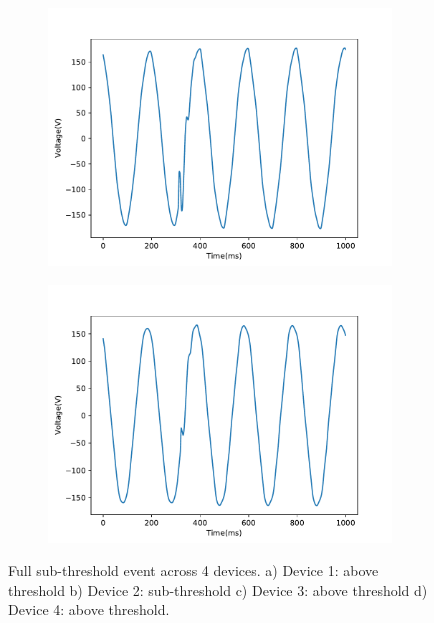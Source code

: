 \begin{figure}[ht!]
    \begin{subfigure}{0.49\textwidth}
        \centering
        \includegraphics[width=1\linewidth]{img/napali_eval/raw_gridwide_sub_full3.pdf}
        \caption{}
        \label{fig:expdes:9:3}
    \end{subfigure}
    \begin{subfigure}{0.49\textwidth}
        \centering
        \includegraphics[width=1\linewidth]{img/napali_eval/raw_gridwide_sub_full4.pdf}
        \caption{}
        \label{fig:expdes:9:4}
    \end{subfigure}
    \caption{Full sub-threshold event across 4 devices.
    a) Device 1: above threshold b) Device 2: sub-threshold c) Device 3: above threshold d) Device 4: above threshold.}
    \label{fig:expdes:9}
\end{figure}

